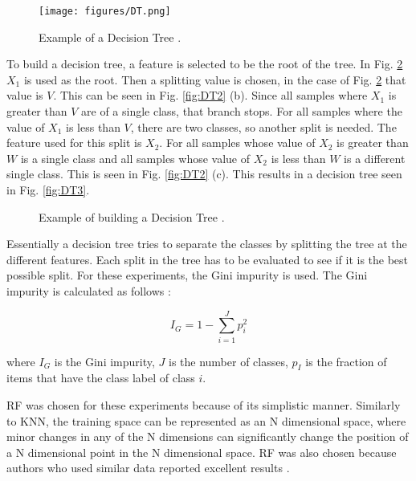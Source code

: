 \documentclass[./AutomatedMK.tex]{subfiles}
\begin{document}
        \begin{figure}
            \centering
            \texttt{[image: figures/DT.png]}
            \caption{Example of a Decision Tree \citep{Marsland}.}
            \label{fig:DT}
        \end{figure}

To build a decision tree, a feature is selected to be the root of the tree. In Fig. \ref{fig:DTBuild} $X_1$ is used as the root. Then a splitting value is chosen, in the case of Fig. \ref{fig:DTBuild} that value is $V$. This can be seen in Fig. \ref{fig:DT2} (b). Since all samples where $X_1$ is greater than $V$ are of a single class, that branch stops. For all samples where the value of $X_1$ is less than $V$, there are two classes, so another split is needed. The feature used for this split is $X_2$. For all samples whose value of $X_2$ is greater than $W$ is a single class and all samples whose value of $X_2$ is less than $W$ is a different single class. This is seen in Fig. \ref{fig:DT2} (c). This results in a decision tree seen in Fig. \ref{fig:DT3}.

\begin{figure}
\centering
{}
     \hfill
\caption{Example of building a Decision Tree \citep{Marsland}.}
\label{fig:DTBuild}
\end{figure}

Essentially a decision tree tries to separate the classes by splitting the tree at the different features. Each split in the tree has to be evaluated to see if it is the best possible split. For these experiments, the Gini impurity is used. The Gini impurity is calculated as follows \citep{Marsland}:

\begin{equation}\label{eq:gini}
I_G = 1 - \sum_{i=1}^{J} p_i^2
\end{equation}

\noindent where $I_G$ is the Gini impurity, $J$ is the number of classes, $p_I$ is the fraction of items that have the class label of class $i$.

RF was chosen for these experiments because of its simplistic manner. Similarly to KNN, the training space can be represented as an N dimensional space, where minor changes in any of the N dimensions can significantly change the position of a N dimensional point in the N dimensional space. RF was also chosen because authors who used similar data reported excellent results \citep{YI}.
\end{document}
